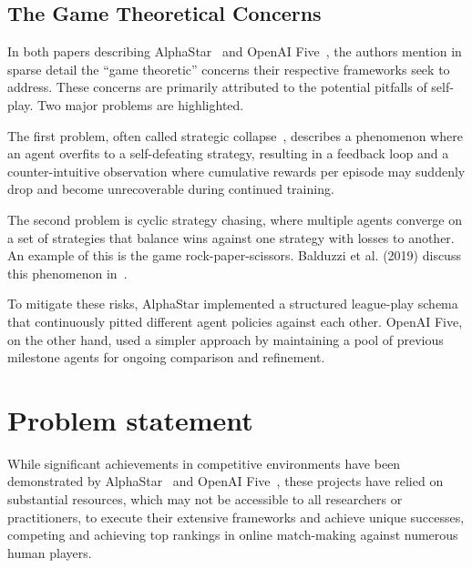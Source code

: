 \subsection*{The Game Theoretical Concerns}%

In both papers describing AlphaStar~\cite{vinyals2019} and OpenAI Five~\cite{berner2019}, 
the authors mention in sparse detail the ``game theoretic'' concerns their respective frameworks 
seek to address. These concerns are primarily attributed to the potential pitfalls of self-play. 
Two major problems are highlighted.

The first problem, often called strategic collapse~\cite{berner2019, vinyals2019}, 
describes a phenomenon where an agent overfits to a self-defeating strategy, 
resulting in a feedback loop and a counter-intuitive observation where cumulative 
rewards per episode may suddenly drop and become unrecoverable during continued training.

The second problem is cyclic strategy chasing, where multiple agents converge on a set of 
strategies that balance wins against one strategy with losses to another. 
An example of this is the game rock-paper-scissors. 
Balduzzi et al. (2019) discuss this phenomenon in~\cite{balduzzi2019}.

To mitigate these risks, AlphaStar implemented a structured league-play schema that continuously 
pitted different agent policies against each other. OpenAI Five, on the other hand, 
used a simpler approach by maintaining a pool of previous milestone agents for ongoing 
comparison and refinement.


\section{Problem statement}%
\label{sec:problem_statement}

\begin{comment}
Current research predominantly tests these algorithms in a narrow manner.
Studies such as~\cite*{zheng2020, wakilpoor2020, kapetanakis2005}
exclusively tested their algorithms in cooperative scenarios.
%
Others such as~\cite*{zhong2024, yu2022} do include competitive environments in their tests.
\end{comment}

While significant achievements in competitive environments have been demonstrated by 
AlphaStar~\cite{vinyals2019} and OpenAI Five~\cite{berner2019}, 
these projects have relied on substantial resources, which may not be accessible to all 
researchers or practitioners, to execute their extensive frameworks and achieve unique successes, 
competing and achieving top rankings in online match-making against numerous human players.


